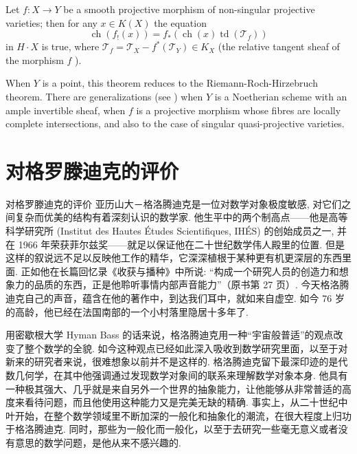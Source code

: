 \documentclass[10pt,aspectratio=169,english,fontset=none]{beamer}
\begin{document}
\begin{frame}
\pause[1]
  \begin{thm}
    Let $f: X \rightarrow Y$ be a smooth projective morphism of non-singular projective varieties; then for any $x \in K(X)$ the equation
$$
\operatorname{ch}\left(f_{!}(x)\right)=f_*\left(\operatorname{ch}(x) \operatorname{td}\left(\mathcal{T}_f\right)\right)
$$
in $H \cdot X$ is true, where $\mathcal{T}_f=\mathcal{T}_X-f^*\left(\mathcal{T}_Y\right) \in K_X$ (the relative tangent sheaf of the morphism $f$ ).
  \end{thm}
  \pause[2]
When $Y$ is a point, this theorem reduces to the Riemann-Roch-Hirzebruch theorem. There are generalizations (see \cite{baum1979riemann,baum1975riemann,ferrand2006theorie}) when $Y$ is a Noetherian scheme with an ample invertible sheaf, when $f$ is a projective morphism whose fibres are locally complete intersections, and also to the case of singular quasi-projective varieties.

\end{frame}

\section{对格罗滕迪克的评价}
\begin{frame}[fragile]{对格罗滕迪克的评价}
\pause[1]
亚历山大－格洛腾迪克是一位对数学对象极度敏感, 对它们之间复杂而优美的结构有着深刻认识的数学家. 他生平中的两个制高点——他是高等科学研究所 (Institut des Hautes Études Scientiﬁques, IHÉS) 的创始成员之一, 并在 1966 年荣获菲尔兹奖——就足以保证他在二十世纪数学伟人殿里的位置. 但是这样的叙说远不足以反映他工作的精华，它深深植根于某种更有机更深层的东西里面. 正如他在长篇回忆录《收获与播种》中所说: \alert{“构成一个研究人员的创造力和想象力的品质的东西，正是他聆听事情内部声音能力”（原书第 27 页）}. 今天格洛腾迪克自己的声音，蕴含在他的著作中，到达我们耳中，就如来自虚空.  如今 76 岁的高龄，他已经在法国南部的一个小村落里隐居十多年了. 

\pause[2]
用密歇根大学 Hyman Bass 的话来说，格洛腾迪克\alert{用一种“宇宙般普适”的观点改变了整个数学的全貌}. 如今这种观点已经如此深入吸收到数学研究里面，以至于对新来的研究者来说，很难想象以前并不是这样的. \alert{格洛腾迪克留下最深印迹的是代数几何学，在其中他强调通过发现数学对象间的联系来理解数学对象本身. 他具有一种极其强大、几乎就是来自另外一个世界的抽象能力，让他能够从非常普适的高度来看待问题，而且他使用这种能力又是完美无缺的精确.} 事实上，从二十世纪中叶开始，在整个数学领域里不断加深的一般化和抽象化的潮流，在很大程度上归功于格洛腾迪克. 同时，那些为一般化而一般化，以至于去研究一些毫无意义或者没有意思的数学问题，是他从来不感兴趣的. 
\end{frame}
\end{document}
